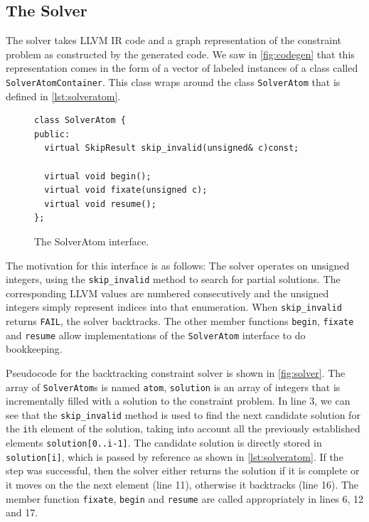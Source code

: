 \subsection{The Solver}

    The solver takes  LLVM IR code and a graph representation of the constraint
    problem as constructed by the generated code.
    We saw in \autoref{fig:codegen} that this representation comes in the form
    of a vector of labeled instances of a class called
    \texttt{SolverAtomContainer}.
    This class wraps around the class \texttt{SolverAtom} that is defined in
    \autoref{lst:solveratom}.

\begin{figure}[ht]
\begin{lstlisting}
class SolverAtom {
public:
  virtual SkipResult skip_invalid(unsigned& c)const;

  virtual void begin();
  virtual void fixate(unsigned c);
  virtual void resume();
};
\end{lstlisting}
\vspace{-0.3cm}
\caption{The SolverAtom interface.}
\label{lst:solveratom}
\end{figure}

    The motivation for this interface is as follows:
    The solver operates on unsigned integers, using the \texttt{skip\_invalid}
    method to search for partial solutions.
    The corresponding LLVM values are numbered consecutively and the unsigned
    integers simply represent indices into that enumeration.
    When \texttt{skip\_invalid} returns \texttt{FAIL}, the solver backtracks.
    The other member functions \texttt{begin}, \texttt{fixate} and
    \texttt{resume} allow implementations of the \texttt{SolverAtom} interface
    to do bookkeeping.

    Pseudocode for the backtracking constraint solver is shown in
    \autoref{fig:solver}.
    The array of \texttt{SolverAtom}s is named \texttt{atom}, \texttt{solution}
    is an array of integers that is incrementally filled with a solution to the
    constraint problem.
    In line 3, we can see that the \texttt{skip\_invalid} method is used to find
    the next candidate solution for the \texttt{i}th element of the solution,
    taking into account all the previously established elements
    \texttt{solution[0..i-1]}.
    The candidate solution is directly stored in \texttt{solution[i]}, which is
    passed by reference as shown in \autoref{lst:solveratom}.
    If the step was successful, then the solver either returns the solution if
    it is complete or it moves on the the next element (line 11), otherwise it
    backtracks (line 16).
    The member function \texttt{fixate}, \texttt{begin} and \texttt{resume} are
    called appropriately in lines 6, 12 and 17.

